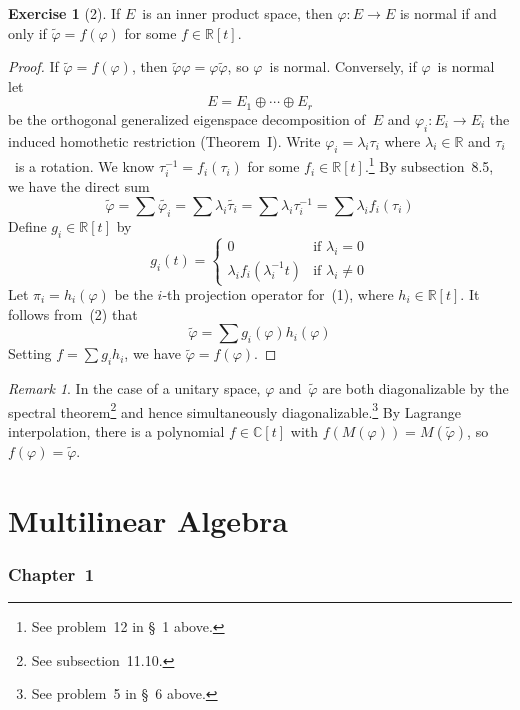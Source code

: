 \documentclass[letterpaper,12pt]{article}
\newcommand{\R}{\mathbb{R}}
\newcommand{\C}{\mathbb{C}}
\newcommand{\dsum}{\oplus}
\newcommand{\adj}[1]{\widetilde{#1}}
\newcommand{\multi}[4]{#2_{#3}#1\cdots#1#2_{#4}}
\newcommand{\dsums}[3]{\multi{\dsum}{#1}{#2}{#3}}
\theoremstyle{definition}
\newtheorem*{exer}{Exercise}
\theoremstyle{remark}
\newtheorem*{rmk}{Remark}
\begin{document}
\begin{exer}[2]
If \(E\)~is an inner product space, then \(\varphi:E\to E\) is normal if and only if \(\adj{\varphi}=f(\varphi)\) for some \(f\in\R[t]\).
\end{exer}
\begin{proof}
If \(\adj{\varphi}=f(\varphi)\), then \(\adj{\varphi}\varphi=\varphi\adj{\varphi}\), so \(\varphi\)~is normal. Conversely, if \(\varphi\)~is normal let
\[E=\dsums{E}{1}{r}\tag{1}\]
be the orthogonal generalized eigenspace decomposition of~\(E\) and \(\varphi_i:E_i\to E_i\) the induced homothetic restriction (Theorem~I). Write \(\varphi_i=\lambda_i\tau_i\) where \(\lambda_i\in\R\) and \(\tau_i\)~is a rotation. We know \(\tau_i^{-1}=f_i(\tau_i)\) for some \(f_i\in\R[t]\).\footnote{See problem~12 in \S~1 above.} By subsection~8.5, we have the direct sum
\[\adj{\varphi}=\sum\adj{\varphi_i}=\sum\lambda_i\adj{\tau_i}=\sum\lambda_i\tau_i^{-1}=\sum\lambda_i f_i(\tau_i)\tag{2}\]
Define \(g_i\in\R[t]\) by
\[g_i(t)=\begin{cases}
0&\text{if }\lambda_i=0\\
\lambda_if_i(\lambda_i^{-1}t)&\text{if }\lambda_i\ne0
\end{cases}\]
Let \(\pi_i=h_i(\varphi)\) be the \(i\)-th projection operator for~(1), where \(h_i\in\R[t]\). It follows from~(2) that
\[\adj{\varphi}=\sum g_i(\varphi)h_i(\varphi)\]
Setting \(f=\sum g_ih_i\), we have \(\adj{\varphi}=f(\varphi)\).
\end{proof}
\begin{rmk}
In the case of a unitary space, \(\varphi\) and~\(\adj{\varphi}\) are both diagonalizable by the spectral theorem\footnote{See subsection~11.10.} and hence simultaneously diagonalizable.\footnote{See problem~5 in \S~6 above.} By Lagrange interpolation, there is a polynomial \(f\in\C[t]\) with \(f(M(\varphi))=M(\adj{\varphi})\), so \(f(\varphi)=\adj{\varphi}\).
\end{rmk}

\newpage
\part*{Multilinear Algebra}
\section*{Chapter~1}
\end{document}
